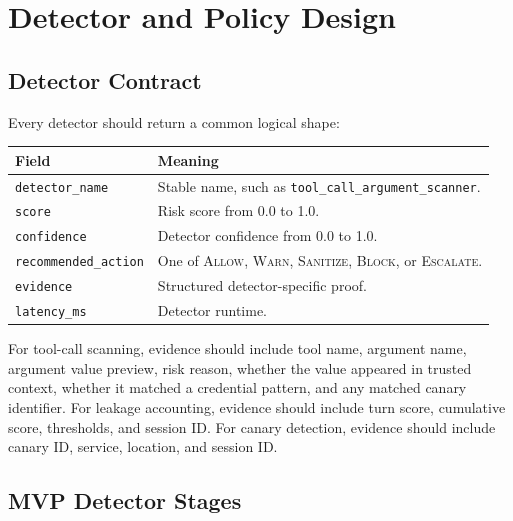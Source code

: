 \documentclass[11pt,letterpaper]{article}
\newcommand{\actionallow}{\textsc{Allow}}
\newcommand{\actionwarn}{\textsc{Warn}}
\newcommand{\actionsanitize}{\textsc{Sanitize}}
\newcommand{\actionblock}{\textsc{Block}}
\newcommand{\actionescalate}{\textsc{Escalate}}
\begin{document}
\section{Detector and Policy Design}

\subsection{Detector Contract}

Every detector should return a common logical shape:

\begin{longtable}{p{}p{}}
\toprule
\textbf{Field} & \textbf{Meaning} \\
\midrule
\texttt{detector\_name} & Stable name, such as \texttt{tool\_call\_argument\_scanner}. \\
\texttt{score} & Risk score from 0.0 to 1.0. \\
\texttt{confidence} & Detector confidence from 0.0 to 1.0. \\
\texttt{recommended\_action} & One of \actionallow, \actionwarn, \actionsanitize, \actionblock, or \actionescalate. \\
\texttt{evidence} & Structured detector-specific proof. \\
\texttt{latency\_ms} & Detector runtime. \\
\bottomrule
\end{longtable}

For tool-call scanning, evidence should include tool name, argument name, argument value preview, risk reason, whether the value appeared in trusted context, whether it matched a credential pattern, and any matched canary identifier. For leakage accounting, evidence should include turn score, cumulative score, thresholds, and session ID. For canary detection, evidence should include canary ID, service, location, and session ID.

\subsection{MVP Detector Stages}
\end{document}
